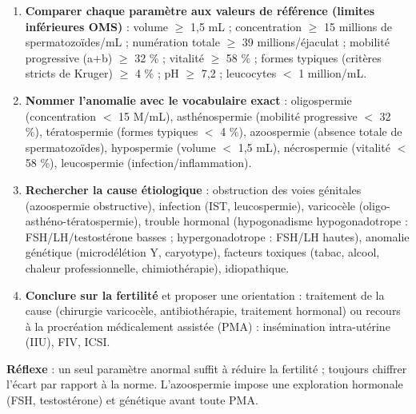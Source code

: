 \documentclass[11pt]{article}
\newcommand{\cle}[1]{{\popxbold\color{popdark}#1}}
\begin{document}
\begin{methode}
\begin{enumerate}
\item \textbf{Comparer chaque paramètre aux valeurs de référence (limites inférieures OMS)} : volume $\geq$ 1,5 mL ; concentration $\geq$ 15 millions de spermatozoïdes/mL ; numération totale $\geq$ 39 millions/éjaculat ; mobilité progressive (a+b) $\geq$ 32 \% ; vitalité $\geq$ 58 \% ; formes typiques (critères stricts de Kruger) $\geq$ 4 \% ; pH $\geq$ 7,2 ; leucocytes $<$ 1 million/mL.
\item \textbf{Nommer l'anomalie avec le vocabulaire exact} : \cle{oligospermie} (concentration $<$ 15 M/mL), \cle{asthénospermie} (mobilité progressive $<$ 32 \%), \cle{tératospermie} (formes typiques $<$ 4 \%), \cle{azoospermie} (absence totale de spermatozoïdes), \cle{hypospermie} (volume $<$ 1,5 mL), \cle{nécrospermie} (vitalité $<$ 58 \%), \cle{leucospermie} (infection/inflammation).
\item \textbf{Rechercher la cause étiologique} : obstruction des voies génitales (azoospermie obstructive), infection (IST, leucospermie), varicocèle (oligo-asthéno-tératospermie), trouble hormonal (hypogonadisme hypogonadotrope : FSH/LH/testostérone basses ; hypergonadotrope : FSH/LH hautes), anomalie génétique (microdélétion Y, caryotype), facteurs toxiques (tabac, alcool, chaleur professionnelle, chimiothérapie), idiopathique.
\item \textbf{Conclure sur la fertilité} et proposer une orientation : traitement de la cause (chirurgie varicocèle, antibiothérapie, traitement hormonal) ou recours à la \cle{procréation médicalement assistée} (PMA) : insémination intra-utérine (IIU), FIV, ICSI.
\end{enumerate}
\textbf{Réflexe} : un seul paramètre anormal suffit à réduire la fertilité ; toujours chiffrer l'écart par rapport à la norme. L'azoospermie impose une exploration hormonale (FSH, testostérone) et génétique avant toute PMA.
\end{methode}
\end{document}
